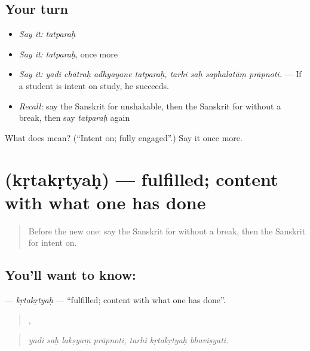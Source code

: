 \subsection*{Your turn}
\begin{itemize}
\raggedright
  \item \emph{Say it:} \emph{tatparaḥ}
  \item \emph{Say it:} \emph{tatparaḥ}, once more
  \item \emph{Say it:} \emph{yadi chātraḥ adhyayane tatparaḥ, tarhi saḥ saphalatāṃ prāpnoti.} — If a student is intent on study, he succeeds.
  \item \emph{Recall:} say the Sanskrit for unshakable, then the Sanskrit for without a break, then say \emph{tatparaḥ} again
\end{itemize}

\begin{tcolorbox}[breakable,colback=teal!4,colframe=teal!35!black,title={Before you move on}]
What does  mean? (\textquotedblleft{}Intent on; fully engaged\textquotedblright{}.) Say it once more.
\end{tcolorbox}
\section[\texorpdfstring{\sk{कृतकृत्यः} (kṛtakṛtyaḥ)}{कृतकृत्यः (kṛtakṛtyaḥ)}]{ (kṛtakṛtyaḥ) — fulfilled; content with what one has done}

\label{lesson:SA-C393-krtakrtyah}



\begin{quote}
Before the new one: say the Sanskrit for without a break, then the Sanskrit for intent on.
\end{quote}

\subsection*{You'll want to know: }
\textbf{} — \emph{kṛtakṛtyaḥ} — \textquotedblleft{}fulfilled; content with what one has done\textquotedblright{}.

\begin{quote}
   ,   
\end{quote}

\begin{quote}
\emph{yadi saḥ lakṣyaṃ prāpnoti, tarhi kṛtakṛtyaḥ bhaviṣyati.}
\end{quote}

